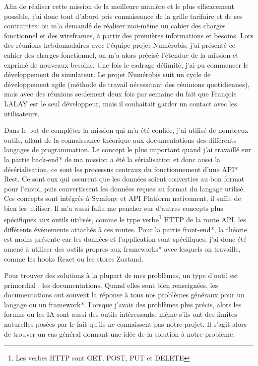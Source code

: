 \documentclass[a4paper,12pt]{report}
\begin{document}
\vspace{1em}

Afin de réaliser cette mission de la meilleure manière et le plus efficacement possible, j'ai donc tout d'abord pris connaissance de la grille tarifaire et de ses contraintes: on m'a demandé de réaliser moi-même un cahier des charges fonctionnel et des wireframes, à partir des premières informations et besoins. Lors des réunions hebdomadaires avec l'équipe projet Numérobis, j'ai présenté ce cahier des charges fonctionnel, on m'a alors précisé l'étendue de la mission et exprimé de nouveaux besoins. Une fois le cadrage délimité, j'ai pu commencer le développement du simulateur. Le projet Numérobis suit un cycle de développement agile (méthode de travail nécessitant des réuinions quotidiennes), 
mais avec des réunions seulement deux fois par semaine du fait que François LALAY est le seul développeur, mais il souhaitait garder un contact avec les utilisateurs.

\vspace{1em}

Dans le but de compléter la mission qui m'a été confiée, j'ai utilisé de nombreux outils, allant de la connaissance théorique aux documentations des différents langages de programmation. Le concept le plus important quand j'ai travaillé sur la partie back-end* de ma mission a été la sérialisation et donc aussi la désérialisation, ce sont les processus centraux du fonctionnement d'une API* Rest. Ce sont eux qui assurent que les données soient converties au bon format pour l'envoi, puis convertissent les données reçues au format du langage utilisé. Ces concepts sont intégrés à Symfony et API Platform nativement, il suffit de bien les utiliser. Il m'a aussi fallu me pencher sur d'autres concepts plus spécifiques aux outils utilisés, comme le type verbe\footnote{Les verbes HTTP sont GET, POST, PUT et DELETE} HTTP de la route API, les différents événements attachés à ces routes. Pour la partie front-end*, la théorie est moins présente car les données et l'application sont spécifiques, j'ai donc été amené à utiliser des outils propres aux frameworks* avec lesquels on travaille, comme les hooks React ou les stores Zustand.

\vspace{1em}

Pour trouver des solutions à la plupart de mes problèmes, un type d'outil est primordial : les documentations. Quand elles sont bien renseignées, les documentations ont souvent la réponse à tous nos problèmes généraux pour un langage ou un framework*. Lorsque j'avais des problèmes plus précis, alors les forums ou les IA sont aussi des outils intéressants, même s'ils ont des limites naturelles posées par le fait qu'ils ne connaissent pas notre projet. Il s'agit alors de trouver un cas général donnant une idée de la solution à notre problème.
\end{document}
